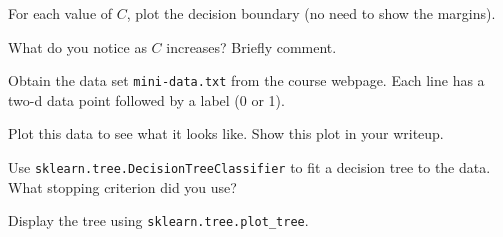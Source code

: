 \documentclass{article}
\begin{document}
\begin{probset}
\begin{progprob}
    \begin{subprobset}
    \begin{subprob}
        For each value of $C$, plot the decision boundary (no need to show the margins).

        \begin{soln}

        \end{soln}
    \end{subprob}

    \begin{subprob}
        What do you notice as $C$ increases? Briefly comment.

        \begin{soln}

        \end{soln}
    \end{subprob}
    \end{subprobset}
\end{progprob}

\begin{progprob}
    Obtain the data set \texttt{mini-data.txt} from the course webpage. Each line has a two-d data point followed by a label (0 or 1).

    \begin{subprobset}
    \begin{subprob}
        Plot this data to see what it looks like. Show this plot in your writeup.

        \begin{soln}

        \end{soln}
    \end{subprob}

    \begin{subprob}
        Use \texttt{sklearn.tree.DecisionTreeClassifier} to fit a decision tree to the data. What stopping criterion did you use?

        \begin{soln}

        \end{soln}
    \end{subprob}

    \begin{subprob}
        Display the tree using \texttt{sklearn.tree.plot\_tree}.

        \begin{soln}


\end{soln}
\end{subprob}
\end{subprobset}
\end{progprob}
\end{probset}
\end{document}
